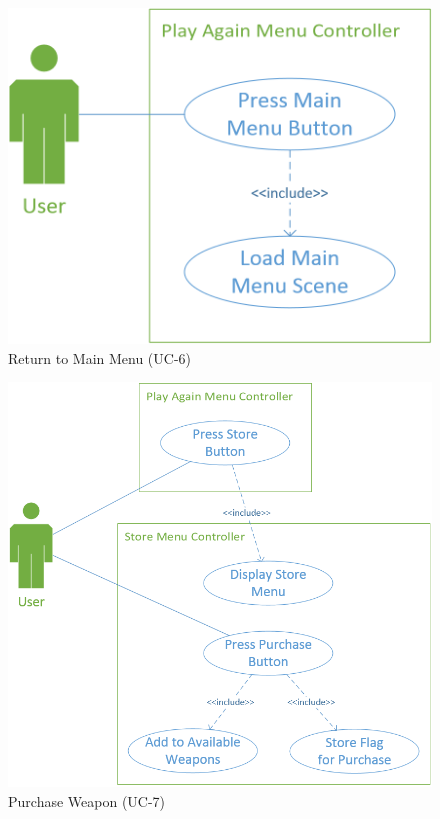 \documentclass[12pt]{report}
\begin{document}
	\begin{figure}
		\centering
		\includegraphics[scale=0.5]{images/ReturnToHome.png}
		\caption{Return to Main Menu (UC-6)}
	\end{figure}
	\begin{figure}
		\centering
		\includegraphics[scale=0.5]{images/PurchaseWeapon.png}
		\caption{Purchase Weapon (UC-7)}
	\end{figure}
\end{document}
